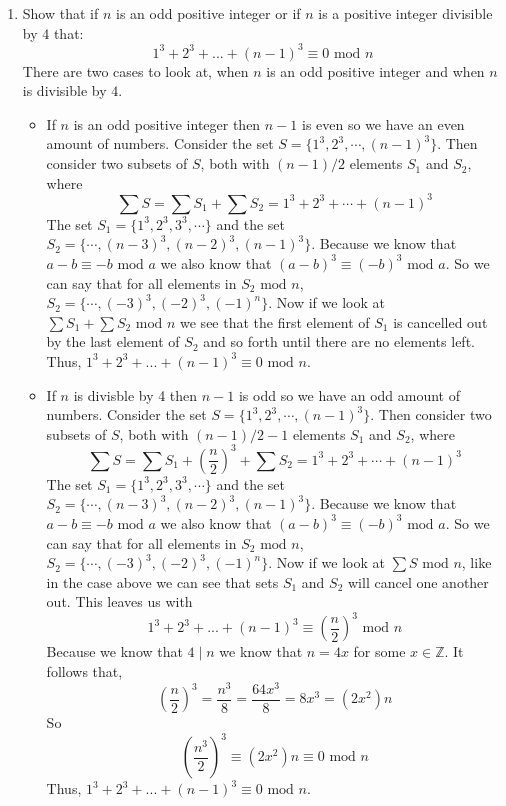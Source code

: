 \documentclass[class=article, crop=false]{standalone}
\def\integers{{\mathbb Z}}
\begin{document}
\begin{enumerate}
\item
  Show that if $n$ is an odd positive integer or if $n$ is a positive
  integer divisible by $4$ that:
  $$1^3+2^3+...+(n-1)^3\equiv 0\mbox{ mod } n$$
  There are two cases to look at, when $n$ is an odd positive integer 
  and when $n$ is divisible by $4$.
  \begin{itemize}
	\item If $n$ is an odd positive integer then $n-1$ is even so we have an even amount of
	numbers. Consider the set $S = \{1^3, 2^3, \cdots, (n-1)^3\}$. Then consider
	two subsets of $S$, both with $(n-1)/2$ elements $S_1$ and $S_2$, where 
	$$\sum S = \sum S_1 + \sum S_2 = 1^3+ 2^3 + \cdots + (n-1)^3$$
	The set $S_1 = \{1^3,2^3,3^3,\cdots\}$ and the set $S_2 = \{\cdots, (n-3)^3, (n-2)^3, (n-1)^3\}$.
	Because we know that $a-b \equiv -b \mbox{ mod } a$ we also know that $(a-b)^3\equiv (-b)^3\mbox{ mod } a$.
	So we can say that for all elements in $S_2 \mbox{ mod } n$, $S_2 = \{\cdots, (-3)^3, (-2)^3, (-1)^n\}$.
	Now if we look at $\sum S_1 + \sum S_2 \mbox{ mod } n$ we see that the first element of $S_1$
	is cancelled out by the last element of $S_2$ and so forth until there are no elements left.
	Thus, $1^3+2^3+...+(n-1)^3\equiv 0\mbox{ mod } n$.

	\item If $n$ is divisble by 4 then $n-1$ is odd so we have an odd amount of numbers.
	Consider the set $S = \{1^3, 2^3, \cdots, (n-1)^3\}$. Then consider two subsets of $S$,
	both with $(n-1)/2 - 1$ elements $S_1$ and $S_2$, where
	$$\sum S = \sum S_1 + \left(\frac{n}{2}\right)^3 + \sum S_2 = 1^3+ 2^3 + \cdots + (n-1)^3$$
	The set $S_1 = \{1^3,2^3,3^3,\cdots\}$ and the set $S_2 = \{\cdots, (n-3)^3, (n-2)^3, (n-1)^3\}$.
	Because we know that $a-b \equiv -b \mbox{ mod } a$ we also know that $(a-b)^3\equiv (-b)^3\mbox{ mod } a$.
	So we can say that for all elements in $S_2 \mbox{ mod } n$, $S_2 = \{\cdots, (-3)^3, (-2)^3, (-1)^n\}$.
	Now if we look at $\sum S \mbox{ mod } n$, like in the case above we can see that sets $S_1$ and $S_2$ will
	cancel one another out. This leaves us with
	$$1^3+2^3+...+(n-1)^3\equiv \left(\frac{n}{2}\right)^3\mbox{ mod } n$$
	Because we know that $4\mid n$ we know that $n=4x$ for some $x\in\integers$. It follows that,
	$$\left(\frac{n}{2}\right)^3 = \frac{n^3}{8} = \frac{64x^3}{8} = 8x^3 = (2x^2)n$$
	So $$\left(\frac{n^3}{2}\right)^3 \equiv (2x^2)n \equiv 0\mbox{ mod } n$$
	Thus, $1^3+2^3+...+(n-1)^3\equiv 0\mbox{ mod } n$.
  \end{itemize}


\end{enumerate}
\end{document}
